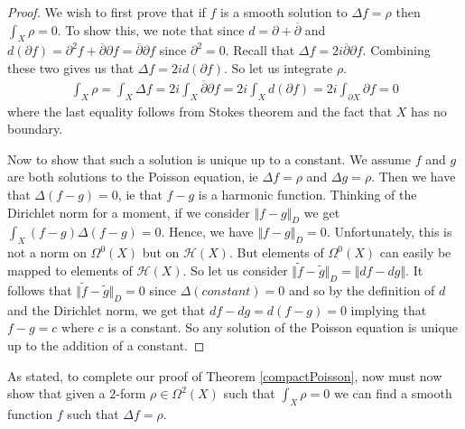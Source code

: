 \documentclass[11pt]{report}
\theoremstyle{definition}
\begin{document}
\begin{proof}
  We wish to first prove that if $f$ is a smooth solution to $\Delta f = \rho$ then $\int_X \rho = 0$. To show this, we note that since $d = \partial + \overline{\partial}$ and $d(\partial f) = \partial^2 f + \overline{\partial}\partial f = \overline{\partial}\partial f$ since $\partial^2 = 0$. Recall that  $\Delta f = 2i \overline{\partial}\partial f$. Combining these two gives us that $\Delta f =2id(\partial f)$. So let us integrate $\rho$.
  \begin{align*}
    \int_X \rho = \int_X \Delta f = 2i \int_X \overline{\partial}\partial f = 2i \int_X d(\partial f) = 2i\int_{\partial X}\partial f = 0
  \end{align*}
  where the last equality follows from Stokes theorem and the fact that $X$ has no boundary. 

  Now to show that such a solution is unique up to a constant. We assume $f$ and $g$ are both solutions to the Poisson equation, ie $\Delta f = \rho$ and $\Delta g = \rho$. Then we have that $\Delta (f - g) = 0$, ie that $f-g$ is a harmonic function. Thinking of the Dirichlet norm for a moment, if we consider $\Vert f-g\Vert _D$ we get $\int_X (f-g)\Delta(f-g) = 0$. Hence, we have $\Vert f-g\Vert _D = 0$. Unfortunately, this is not a norm on $\Omega^0(X)$ but on $\mathcal{H}(X)$. But elements of $\Omega^0(X)$ can easily be mapped to elements of $\mathcal{H}(X)$. So let us consider $\Vert \tilde{f}-\tilde{g}\Vert _D = \Vert df - dg\Vert $. It follows that $\Vert \tilde{f}-\tilde{g}\Vert _D = 0$ since $\Delta(constant) = 0$ and so by the definition of $d$ and the Dirichlet norm, we get that $ df - dg = d(f-g) = 0$ implying that $f - g = c$ where $c$ is a constant. So any solution of the Poisson equation is unique up to the addition of a constant.
\end{proof} 

As stated, to complete our proof of Theorem \ref{compactPoisson}, now must now show that given a $2$-form $\rho \in \Omega^2(X)$ such that $\int_X \rho = 0$ we can find a smooth function $f$ such that $\Delta f = \rho$. 
\end{document}
